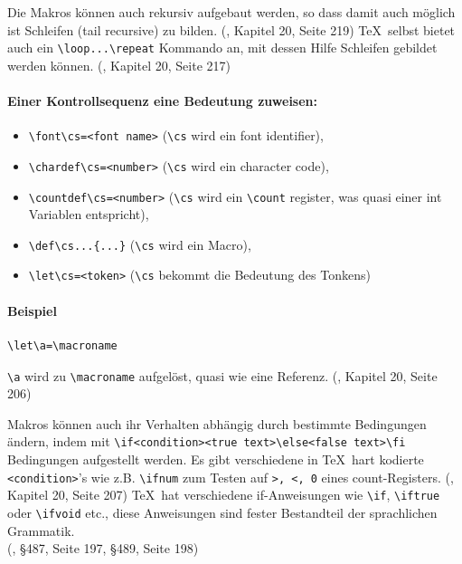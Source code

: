 Die Makros können auch rekursiv aufgebaut werden, so dass damit auch möglich ist
Schleifen (tail recursive) zu bilden.
(\cite{tex-a}, Kapitel 20, Seite 219)
\TeX~selbst bietet auch ein \lstinline|\loop...\repeat| Kommando an,
mit dessen Hilfe Schleifen gebildet werden können.
(\cite{tex-a}, Kapitel 20, Seite 217)


\paragraph{Einer Kontrollsequenz eine Bedeutung zuweisen:}

\begin{itemize}
  \item \lstinline|\font\cs=<font name>|
        (\lstinline|\cs| wird ein font identifier),
  \item \lstinline|\chardef\cs=<number>|
        (\lstinline|\cs| wird ein character code),
  \item \lstinline|\countdef\cs=<number>|
        (\lstinline|\cs| wird ein \lstinline|\count| register,
        was quasi einer int Variablen entspricht),
  \item \lstinline|\def\cs...{...}|
        (\lstinline|\cs| wird ein Macro),
  \item \lstinline|\let\cs=<token>|
        (\lstinline|\cs| bekommt die Bedeutung des Tonkens)
\end{itemize}

\paragraph{Beispiel}

\begin{verbatim}
\let\a=\macroname
\end{verbatim}

\lstinline|\a| wird zu \lstinline|\macroname| aufgelöst, quasi wie eine Referenz.
(\cite{tex-a}, Kapitel 20, Seite 206)


Makros können auch ihr Verhalten abhängig durch bestimmte Bedingungen
ändern, indem mit \lstinline|\if<condition><true text>\else<false text>\fi|
Bedingungen
aufgestellt werden. Es gibt verschiedene in \TeX~hart kodierte
\lstinline|<condition>|'s
wie z.B. \lstinline|\ifnum| zum Testen auf \lstinline|>, <, 0| eines count-Registers.
(\cite{tex-a}, Kapitel 20, Seite 207)
\TeX~hat verschiedene if-Anweisungen wie \lstinline|\if|, \lstinline|\iftrue| oder \lstinline|\ifvoid| etc.,
diese Anweisungen sind fester Bestandteil der sprachlichen Grammatik.\\
(\cite{tex-a}, §487, Seite 197, §489, Seite 198)


